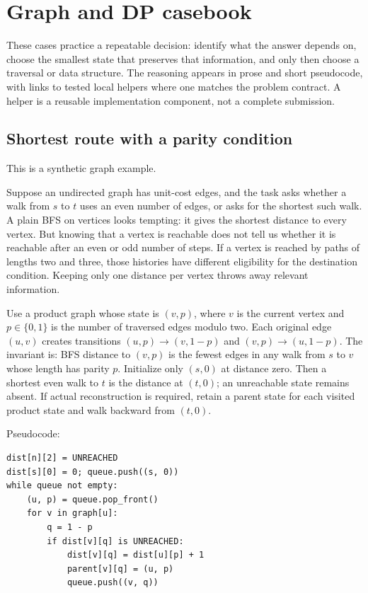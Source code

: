 \section{Graph and DP casebook}

These cases practice a repeatable decision: identify what the answer depends
on, choose the smallest state that preserves that information, and only then
choose a traversal or data structure. The reasoning appears in prose and
short pseudocode, with links to tested local helpers where one matches the
problem contract. A helper is a reusable implementation component, not a
complete submission.

\subsection{Shortest route with a parity condition}
\label{case:state-bfs}
This is a synthetic graph example.

Suppose an undirected graph has unit-cost edges, and the task asks whether a
walk from $s$ to $t$ uses an even number of edges, or asks for the shortest
such walk. A plain BFS on vertices looks tempting: it gives the shortest
distance to every vertex. But knowing that a vertex is reachable does not
tell us whether it is reachable after an even or odd number of steps. If a
vertex is reached by paths of lengths two and three, those histories have
different eligibility for the destination condition. Keeping only one
distance per vertex throws away relevant information.

Use a product graph whose state is $(v,p)$, where $v$ is the current vertex
and $p\in\{0,1\}$ is the number of traversed edges modulo two. Each original
edge $(u,v)$ creates transitions $(u,p)\to(v,1-p)$ and
$(v,p)\to(u,1-p)$. The invariant is: BFS distance to $(v,p)$ is the fewest
edges in any walk from $s$ to $v$ whose length has parity $p$. Initialize
only $(s,0)$ at distance zero. Then a shortest even walk to $t$ is the
distance at $(t,0)$; an unreachable state remains absent. If actual
reconstruction is required, retain a parent state for each visited product
state and walk backward from $(t,0)$.

Pseudocode:
\begin{lstlisting}
dist[n][2] = UNREACHED
dist[s][0] = 0; queue.push((s, 0))
while queue not empty:
    (u, p) = queue.pop_front()
    for v in graph[u]:
        q = 1 - p
        if dist[v][q] is UNREACHED:
            dist[v][q] = dist[u][p] + 1
            parent[v][q] = (u, p)
            queue.push((v, q))
\end{lstlisting}


